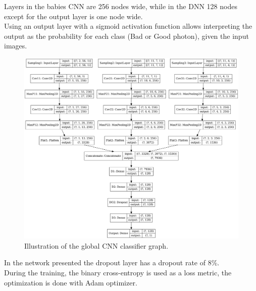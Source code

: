 Layers in the babies CNN are 256 nodes wide, while in the DNN 128 nodes except for the output layer is one node wide.\\
Using an output layer with a sigmoid activation function allows interpreting the output as the probability for each class (Bad or Good photon), given the input images.\\
\begin{figure}[H]
    \centering
    \includegraphics[width=1.\textwidth]{Ch3/Img/CNN_model.png}
    \caption{Illustration of the global CNN classifier graph.}
    \label{fig:gamma:CNN:Model:Arch}
\end{figure}
In the network presented the dropout layer has a dropout rate of 8\%.\\
During the training, the binary cross-entropy is used as a loss metric, the optimization is done with Adam optimizer.
